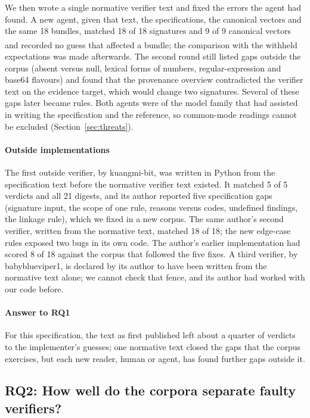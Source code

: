 \documentclass[preprint,12pt,authoryear]{elsarticle}
\newcommand{\priv}{\textsuperscript{\textdagger}}
\begin{document}
We then wrote a single normative verifier text and fixed the errors the agent had found. A new agent, given that text, the specifications, the canonical vectors and the same 18 bundles, matched 18 of 18 signatures and 9 of 9 canonical vectors and recorded no guess that affected a bundle\priv; the comparison with the withheld expectations was made afterwards. The second round still listed gaps outside the corpus (absent versus null, lexical forms of numbers, regular-expression and base64 flavours) and found that the provenance overview contradicted the verifier text on the evidence target, which would change two signatures. Several of these gaps later became rules. Both agents were of the model family that had assisted in writing the specification and the reference, so common-mode readings cannot be excluded (Section~\ref{sec:threats}).

\paragraph{Outside implementations} The first outside verifier, by kuangmi-bit, was written in Python from the specification text before the normative verifier text existed. It matched 5 of 5 verdicts and all 21 digests, and its author reported five specification gaps (signature input, the scope of one rule, reasons versus codes, undefined findings, the linkage rule), which we fixed in a new corpus. The same author's second verifier, written from the normative text, matched 18 of 18; the new edge-case rules exposed two bugs in its own code. The author's earlier implementation had scored 8 of 18 against the corpus that followed the five fixes. A third verifier, by babyblueviper1, is declared by its author to have been written from the normative text alone; we cannot check that fence, and its author had worked with our code before.

\paragraph{Answer to RQ1} For this specification, the text as first published left about a quarter of verdicts to the implementer's guesses; one normative text closed the gaps that the corpus exercises, but each new reader, human or agent, has found further gaps outside it.

\subsection{RQ2: How well do the corpora separate faulty verifiers?}\label{sec:rq2}
\end{document}
